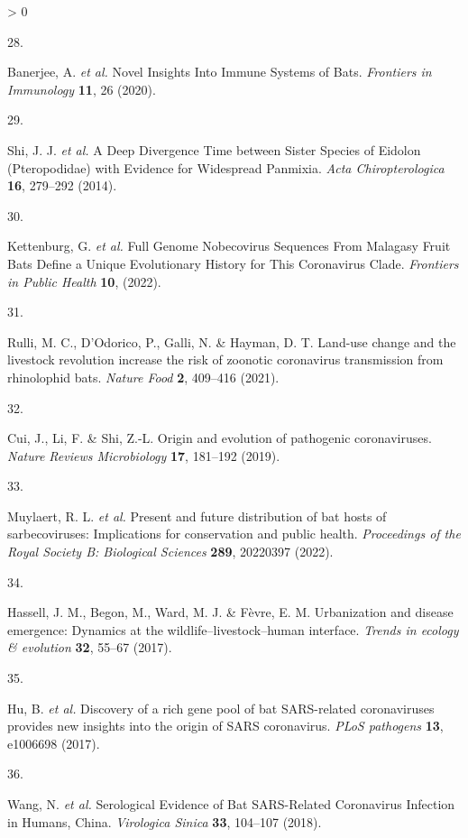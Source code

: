 \documentclass[10pt,oneside]{article}
\newlength{\cslhangindent}
\newlength{\csllabelwidth}
\newenvironment{CSLReferences}[3] %
 {%
  \setlength{\parindent}{0pt}
  \ifodd #1 \everypar{\setlength{\hangindent}{\cslhangindent}}\ignorespaces\fi
  \ifnum #2 > 0
  \setlength{\parskip}{#2\baselineskip}
  \fi
 }%
 {}
\newcommand{\CSLLeftMargin}[1]{\parbox[t]{\maxof{\widthof{#1}}{\csllabelwidth}}{#1}}
\newcommand{\CSLRightInline}[1]{\parbox[t]{\linewidth}{#1}}
\begin{document}
\begin{CSLReferences}{0}{0}
\leavevmode\hypertarget{ref-Banerjee2020Novel}{}%
\CSLLeftMargin{28. }
\CSLRightInline{Banerjee, A. \emph{et al.} Novel Insights Into Immune
Systems of Bats. \emph{Frontiers in Immunology} \textbf{11}, 26 (2020).}

\leavevmode\hypertarget{ref-Shi2014Deep}{}%
\CSLLeftMargin{29. }
\CSLRightInline{Shi, J. J. \emph{et al.} A Deep Divergence Time between
Sister Species of Eidolon (Pteropodidae) with Evidence for Widespread
Panmixia. \emph{Acta Chiropterologica} \textbf{16}, 279--292 (2014).}

\leavevmode\hypertarget{ref-Kettenburg2022Full}{}%
\CSLLeftMargin{30. }
\CSLRightInline{Kettenburg, G. \emph{et al.} Full Genome Nobecovirus
Sequences From Malagasy Fruit Bats Define a Unique Evolutionary History
for This Coronavirus Clade. \emph{Frontiers in Public Health}
\textbf{10}, (2022).}

\leavevmode\hypertarget{ref-Rulli2021Landuse}{}%
\CSLLeftMargin{31. }
\CSLRightInline{Rulli, M. C., D'Odorico, P., Galli, N. \& Hayman, D. T.
Land-use change and the livestock revolution increase the risk of
zoonotic coronavirus transmission from rhinolophid bats. \emph{Nature
Food} \textbf{2}, 409--416 (2021).}

\leavevmode\hypertarget{ref-Cui2019Origin}{}%
\CSLLeftMargin{32. }
\CSLRightInline{Cui, J., Li, F. \& Shi, Z.-L. Origin and evolution of
pathogenic coronaviruses. \emph{Nature Reviews Microbiology}
\textbf{17}, 181--192 (2019).}

\leavevmode\hypertarget{ref-Muylaert2022Present}{}%
\CSLLeftMargin{33. }
\CSLRightInline{Muylaert, R. L. \emph{et al.} Present and future
distribution of bat hosts of sarbecoviruses: Implications for
conservation and public health. \emph{Proceedings of the Royal Society
B: Biological Sciences} \textbf{289}, 20220397 (2022).}

\leavevmode\hypertarget{ref-Hassell2017Urbanization}{}%
\CSLLeftMargin{34. }
\CSLRightInline{Hassell, J. M., Begon, M., Ward, M. J. \& Fèvre, E. M.
Urbanization and disease emergence: Dynamics at the
wildlife--livestock--human interface. \emph{Trends in ecology \&
evolution} \textbf{32}, 55--67 (2017).}

\leavevmode\hypertarget{ref-Hu2017Discovery}{}%
\CSLLeftMargin{35. }
\CSLRightInline{Hu, B. \emph{et al.} Discovery of a rich gene pool of
bat SARS-related coronaviruses provides new insights into the origin of
SARS coronavirus. \emph{PLoS pathogens} \textbf{13}, e1006698 (2017).}

\leavevmode\hypertarget{ref-Wang2018Serological}{}%
\CSLLeftMargin{36. }
\CSLRightInline{Wang, N. \emph{et al.} Serological Evidence of Bat
SARS-Related Coronavirus Infection in Humans, China. \emph{Virologica
Sinica} \textbf{33}, 104--107 (2018).}


\end{CSLReferences}
\end{document}
